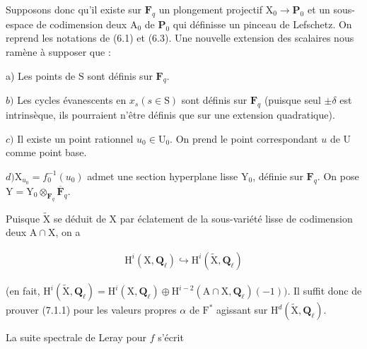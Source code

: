 \documentclass[10pt,leqno]{article}
\begin{document}
\noindent Supposons donc qu’il existe sur \(\mathbf{F}_{q}\) un plongement projectif \(\mathrm{X}_{0}\longrightarrow \mathbf{P}_{0}\) et un sous-espace de codimension deux \(\mathrm{A}_{0}\) de \(\mathbf{P}_{0}\) qui définisse un pinceau de Lefschetz. On reprend les notations de (6.1) et (6.3). Une nouvelle extension des scalaires nous ramène à supposer que :\par

\noindent a) Les points de \(\mathrm{S}\) sont définis sur \(\mathbf{F}_{q}\).\par

\noindent \(b)\) Les cycles évanescents en \(x_{s} (s\in \mathrm{S})\) sont définis sur \(\mathbf{F}_{q}\) (puisque seul \(\pm \delta \) est intrinsèque, ils pourraient n’être définis que sur une extension quadratique).\par

\noindent \(c)\) Il existe un point rationnel \(u_{0}\in \mathrm{U}_{0}\). On prend le point correspondant \(u\) de \(\mathrm{U}\) comme point base.\par

\noindent \(d) \mathrm{X}_{u_{0}}=f_{0}^{- 1}(u_{0})\) admet une section hyperplane lisse \(\mathrm{Y}_{0}\), définie sur \(\mathbf{F}_{q}\). On pose \(\mathrm{Y}=\mathrm{Y}_{0}\otimes _{\mathbf{F}_{q}}\overline{\mathbf{F}}_{q}\).\par

\noindent Puisque \(\widetilde{\mathrm{X}}\) se déduit de \(\mathrm{X}\) par éclatement de la sous-variété lisse de codimension deux \(\mathrm{A}\cap \mathrm{X}\), on a\par

\begin{equation*}\begin{gathered}\mathrm{H}^{i}(\mathrm{X},\mathbf{Q}_{\ell }) \hookrightarrow  \mathrm{H}^{i}(\widetilde{\mathrm{X}},\mathbf{Q}_{\ell })\end{gathered}\end{equation*}

\noindent (en fait, \(\mathrm{H}^{i}(\widetilde{\mathrm{X}},\mathbf{Q}_{\ell })=\mathrm{H}^{i}(\mathrm{X},\mathbf{Q}_{\ell })\oplus \mathrm{H}^{i- 2}(\mathrm{A}\cap \mathrm{X},\mathbf{Q}_{\ell })(- 1))\). Il suffit donc de prouver (7.1.1) pour les valeurs propres \(\alpha \) de \(\mathrm{F}^{*}\) agissant sur \(\mathrm{H}^{d}(\widetilde{\mathrm{X}},\mathbf{Q}_{\ell })\).\par

\noindent La suite spectrale de Leray pour \(f\) s’écrit\par
\end{document}
